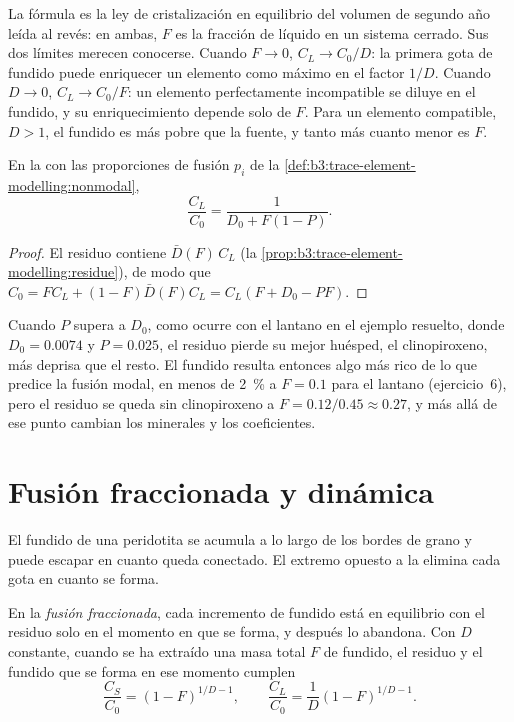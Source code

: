 La fórmula es la ley de cristalización en equilibrio del volumen de segundo año leída
al revés: en ambas, $F$ es la fracción de líquido en un sistema cerrado. Sus dos
límites merecen conocerse. Cuando $F \to 0$, $C_L \to C_0/D$: la primera gota de fundido
puede enriquecer un elemento como máximo en el factor $1/D$. Cuando $D \to 0$, $C_L \to
C_0/F$: un elemento perfectamente incompatible se diluye en el fundido, y su
enriquecimiento depende solo de $F$. Para un elemento compatible, $D > 1$, el fundido
es más pobre que la fuente, y tanto más cuanto menor es $F$.

\begin{proposition}\label{prop:b3:trace-element-modelling:nonmodal}
En la  con las proporciones de fusión $p_i$ de la \cref{def:b3:trace-element-modelling:nonmodal},
\[
\frac{C_L}{C_0} = \frac{1}{D_0 + F(1 - P)}.
\]
\end{proposition}

\begin{proof}
El residuo contiene $\bar D(F)\,C_L$ (la \cref{prop:b3:trace-element-modelling:residue}),
de modo que $C_0 = FC_L + (1 - F)\bar D(F)C_L = C_L(F + D_0 - PF)$.
\end{proof}

Cuando $P$ supera a $D_0$, como ocurre con el lantano en el ejemplo resuelto, donde $D_0 =
0.0074$ y $P = 0.025$, el residuo pierde su mejor huésped, el clinopiroxeno, más deprisa
que el resto. El fundido resulta entonces algo más rico de lo que predice la fusión modal,
en menos de \qty{2}{\percent} a $F = 0.1$ para el lantano (ejercicio~6), pero el
residuo se queda sin clinopiroxeno a $F = 0.12/0.45 \approx 0.27$, y más allá de
ese punto cambian los minerales y los coeficientes.

\section{Fusión fraccionada y dinámica}\label{sec:b3:trace-element-modelling:fractional}

El fundido de una peridotita se acumula a lo largo de los bordes de grano y puede escapar
en cuanto queda conectado. El extremo opuesto a la  elimina cada gota
en cuanto se forma.

\begin{theorem}\label{thm:b3:trace-element-modelling:fractional}
En la \emph{fusión fraccionada}, cada incremento de fundido
está en equilibrio con el residuo solo en el momento en que se forma, y después
lo abandona. Con $D$ constante, cuando se ha extraído una masa total $F$ de fundido, el
residuo y el fundido que se forma en ese momento cumplen
\[
\frac{C_S}{C_0} = (1 - F)^{1/D - 1}, \qquad
\frac{C_L}{C_0} = \frac{1}{D}(1 - F)^{1/D - 1}.
\]
\end{theorem}

